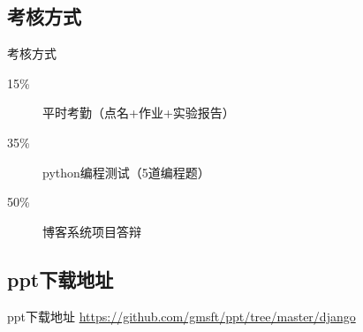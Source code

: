 \documentclass{beamer}
\begin{document}
\subsection{考核方式}
\begin{frame}{考核方式}
\begin{description}
\item[ 15\% ] 平时考勤（点名+作业+实验报告）
\item[ 35\% ] python编程测试（5道编程题） 
\item[ 50\% ] 博客系统项目答辩
\end{description}

\end{frame}
\subsection{ppt下载地址}
\begin{frame}{ppt下载地址}
\url{https://github.com/gmsft/ppt/tree/master/django}
\end{frame}
\end{document}
